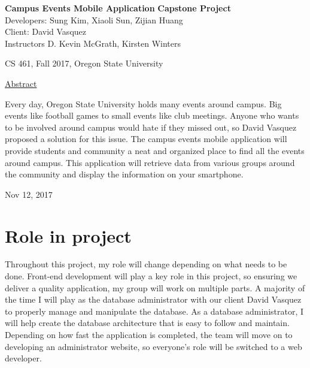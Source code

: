 \documentclass[letterpaper, 10pt,titlepage]{article}
\begin{document}
\begin{titlepage}
\begin{center}
    \Huge
    \textbf{Campus Events Mobile Application}
    \textbf{Capstone Project}\\
    \vspace{1.0cm}
    \large
    Developers: Sung Kim, Xiaoli Sun, Zijian Huang\\
    Client: David Vasquez\\
    \vspace{1.5cm}
    \large
    Instructors D. Kevin McGrath, Kirsten Winters

    \large
    CS 461, Fall 2017, Oregon State University\\    

    \vspace{3.2cm}

    \large
    \underline{Abstract}\\
    \vspace{0.3cm}
    \end{center}
    \large

Every day, Oregon State University holds many events around campus. Big events like football games to small events like club meetings. Anyone who wants to be involved around campus would hate if they missed out, so David Vasquez proposed a solution for this issue. The campus events mobile application will provide students and community a neat and organized place to find all the events around campus. This application will retrieve data from various groups around the community and display the information on your smartphone. 
    
    \vspace{0.8cm}
    \vfill
    
\begin{center}    
    Nov 12, 2017

\end{center}
\end{titlepage}


\tableofcontents
\newpage



\section{Role in project}

Throughout this project, my role will change depending on what needs to be done. Front-end development will play a key role in this project, so ensuring we deliver a quality application, my group will work on multiple parts. A majority of the time I will play as the database administrator with our client David Vasquez to properly manage and manipulate the database. As a database administrator, I will help create the database architecture that is easy to follow and maintain. Depending on how fast the application is completed, the team will move on to developing an administrator website, so everyone's role will be switched to a web developer.
\end{document}
